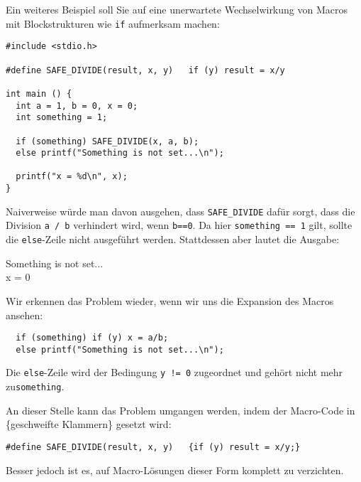 \begin{warnbox}
Ein weiteres Beispiel soll Sie auf eine unerwartete Wechselwirkung von Macros mit Blockstrukturen wie \texttt{if} aufmerksam machen:

\begin{codebox}
\begin{verbatim}
#include <stdio.h>

#define SAFE_DIVIDE(result, x, y)   if (y) result = x/y

int main () {
  int a = 1, b = 0, x = 0;
  int something = 1;
  
  if (something) SAFE_DIVIDE(x, a, b);
  else printf("Something is not set...\n");
  
  printf("x = %d\n", x);
}
\end{verbatim}
\end{codebox}

Naiverweise würde man davon ausgehen, dass \texttt{SAFE\_DIVIDE} dafür sorgt, dass die Division 
\texttt{a / b} verhindert wird, wenn \texttt{b==0}. Da hier \texttt{something == 1} gilt, sollte die \texttt{else}-Zeile nicht ausgeführt werden. Stattdessen aber lautet die Ausgabe:

\begin{cmdbox}
Something is not set...\\
x = 0
\end{cmdbox}

Wir erkennen das Problem wieder, wenn wir uns die Expansion des Macros ansehen:

\begin{codebox}
\begin{verbatim}
  if (something) if (y) x = a/b;
  else printf("Something is not set...\n");
\end{verbatim}
\end{codebox}

Die \texttt{else}-Zeile wird der Bedingung \texttt{y != 0} zugeordnet und gehört nicht mehr zu\texttt{something}.

An dieser Stelle kann das Problem umgangen werden, indem der Macro-Code in \{geschweifte Klammern\} gesetzt wird:
\begin{center}
\begin{verbatim}
#define SAFE_DIVIDE(result, x, y)   {if (y) result = x/y;}
\end{verbatim}
\end{center}

Besser jedoch ist es, auf Macro-Lösungen dieser Form komplett zu verzichten.
\end{warnbox}

